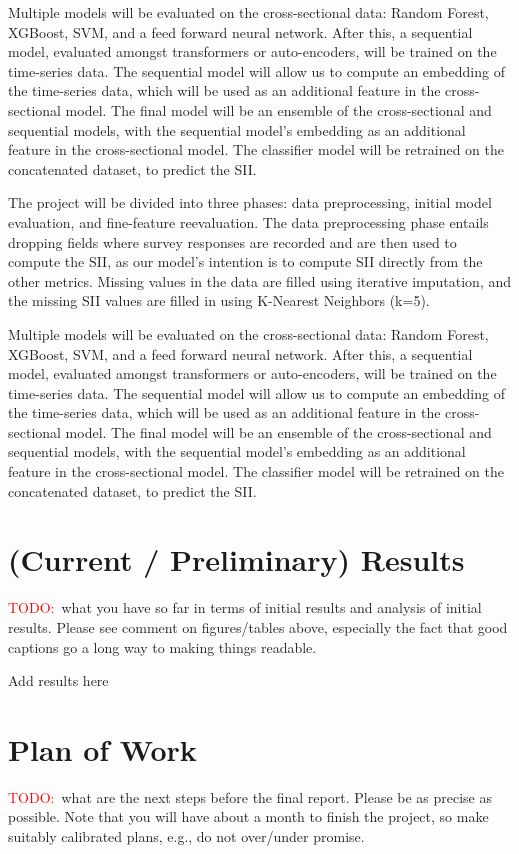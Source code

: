 \documentclass[11pt]{extarticle}
\newcommand{\todo}{\textcolor{red}{TODO:}~}
\begin{document}
Multiple models will be evaluated on the cross-sectional data: Random Forest, XGBoost, SVM, and a feed forward neural network. After this, a sequential model, evaluated amongst transformers or auto-encoders, will be trained on the time-series data. The sequential model will allow us to compute an embedding of the time-series data, which will be used as an additional feature in the cross-sectional model.
The final model will be an ensemble of the cross-sectional and sequential models, with the sequential model's embedding as an additional feature in the cross-sectional model. The classifier model will be retrained on the concatenated dataset, to predict the SII.

The project will be divided into three phases: data preprocessing, initial model evaluation, and fine-feature reevaluation.
The data preprocessing phase entails dropping fields where survey responses are recorded and are then used to compute the SII, as our model's intention is to compute SII directly from the other metrics.
Missing values in the data are filled using iterative imputation, and the missing SII values are filled in using K-Nearest Neighbors (k=5).

Multiple models will be evaluated on the cross-sectional data: Random Forest, XGBoost, SVM, and a feed forward neural network. After this, a sequential model, evaluated amongst transformers or auto-encoders, will be trained on the time-series data. The sequential model will allow us to compute an embedding of the time-series data, which will be used as an additional feature in the cross-sectional model.
The final model will be an ensemble of the cross-sectional and sequential models, with the sequential model's embedding as an additional feature in the cross-sectional model. The classifier model will be retrained on the concatenated dataset, to predict the SII.

\section{(Current / Preliminary) Results} 
\todo what you have so far in terms of initial results and analysis of initial results. Please see comment on figures/tables above, especially the fact that good captions go a long way to making things readable.

\begin{mdframed}
    Add results here
\end{mdframed}

\section{Plan of Work} 
\todo what are the next steps before the final report. Please be as precise as possible. Note that you will have about a month to finish the project, so make suitably calibrated plans, e.g., do not over/under promise.
\end{document}
